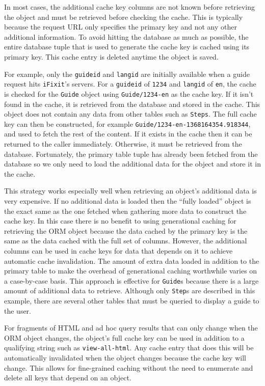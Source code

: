 \documentclass[12pt]{ucthesis}
\begin{document}
In most cases, the additional cache key columns are not known before retrieving the object and must be retrieved before checking the cache.
This is typically because the request URL only specifies the primary key and not any other additional information.
To avoid hitting the database as much as possible, the entire database tuple that is used to generate the cache key is cached using its primary key.
This cache entry is deleted anytime the object is saved.

For example, only the {\tt guideid} and {\tt langid} are initially available when a guide request hits {\tt iFixit}'s servers.
For a {\tt guideid} of {\tt 1234} and {\tt langid} of {\tt en}, the cache is checked for the {\tt Guide} object using {\tt Guide/1234-en} as the cache key.
If it isn't found in the cache, it is retrieved from the database and stored in the cache.
This object does not contain any data from other tables such as {\tt Steps}.
The full cache key can then be constructed, for example {\tt Guide/1234-en-1368164354.918344}, and used to fetch the rest of the content.
If it exists in the cache then it can be returned to the caller immediately.
Otherwise, it must be retrieved from the database.
Fortunately, the primary table tuple has already been fetched from the database so we only need to load the additional data for the object and store it in the cache.

This strategy works especially well when retrieving an object's additional data is very expensive.
If no additional data is loaded then the ``fully loaded'' object is the exact same as the one fetched when gathering more data to construct the cache key.
In this case there is no benefit to using generational caching for retrieving the ORM object because the data cached by the primary key is the same as the data cached with the full set of columns.
However, the additional columns can be used in cache keys for data that depends on it to achieve automatic cache invalidation.
The amount of extra data loaded in addition to the primary table to make the overhead of generational caching worthwhile varies on a case-by-case basis.
This approach is effective for {\tt Guide}s because there is a large amount of additional data to retrieve.
Although only {\tt Step}s are described in this example, there are several other tables that must be queried to display a guide to the user.

For fragments of HTML and ad hoc query results that can only change when the ORM object changes, the object's full cache key can be used in addition to a qualifying string such as {\tt view-all-html}.
Any cache entry that does this will be automatically invalidated when the object changes because the cache key will change.
This allows for fine-grained caching without the need to enumerate and delete all keys that depend on an object.
\end{document}
